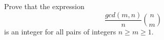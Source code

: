 Prove that the expression
\[ \frac{gcd(m,n)}{n}\binom{n}{m} \]
is an integer for all pairs of integers $n\geq m\geq 1$.
